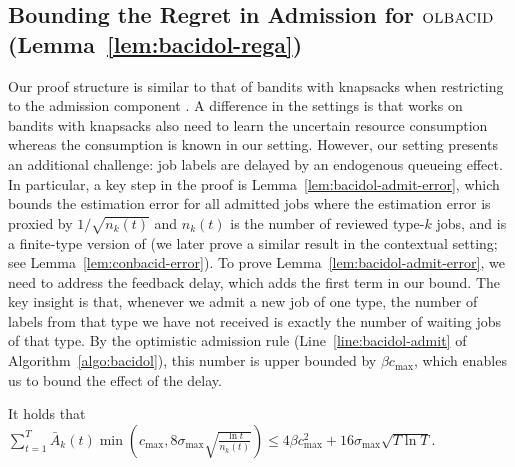 \subsection{Bounding the Regret in Admission for $\textsc{OLBACID}$ (Lemma~\ref{lem:bacidol-rega})}\label{app:lem-bacidol-rega}
Our proof structure is similar to that of bandits with knapsacks when restricting to the admission component \cite{agrawal2019bandits}. A difference in the settings is that works on bandits with knapsacks also need to learn the uncertain resource consumption whereas the consumption is known in our setting. However, our setting presents an additional challenge: job labels are delayed by an endogenous queueing effect. In particular, a key step in the proof is Lemma~\ref{lem:bacidol-admit-error}, which bounds the estimation error for all admitted jobs where the estimation error is proxied by $1/\sqrt{n_k(t)}$ and $n_k(t)$ is the number of reviewed type-$k$ jobs, and is a finite-type version of  \cite[Lemma~3]{AgrawalD16} (we later prove a similar result in the contextual setting; see Lemma~\ref{lem:conbacid-error}). To prove Lemma~\ref{lem:bacidol-admit-error}, we need to address the feedback delay, which adds the first term in our bound. The key insight is that, whenever we admit a new job of one type, the number of labels from that type we have not received is exactly the number of waiting jobs of that type. By the optimistic admission rule (Line~\ref{line:bacidol-admit} of Algorithm~\ref{algo:bacidol}), this number is upper bounded by $\beta c_{\max}$, which enables us to bound the effect of the delay.
\begin{lemma}\label{lem:bacidol-admit-error}
It holds that $\sum_{t=1}^T\bar{A}_k(t)\min\left(c_{\max},8\sigma_{\max}\sqrt{\frac{\ln t}{n_k(t)}}\right) \leq 4\beta c^2_{\max}+16\sigma_{\max}\sqrt{T\ln T}$.
\end{lemma}
